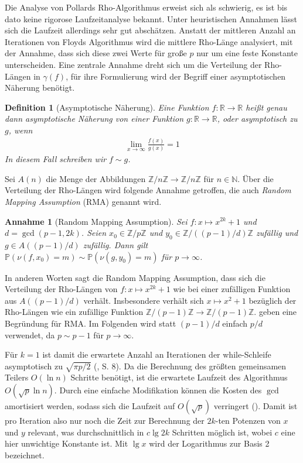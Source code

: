 \documentclass[a4paper, 10pt, ngerman]{article}
\newcommand{\N}{\mathbb{N}}
\newcommand{\R}{\mathbb{R}}
\newcommand{\Z}{\mathbb{Z}}
\renewcommand{\P}{\mathbb{P}}
\newtheorem{definition}{Definition}
\newtheorem*{assumption*}{Annahme}
\begin{document}
\noindent Die Analyse von Pollards Rho-Algorithmus erweist sich als schwierig, es ist bis dato keine rigorose Laufzeitanalyse bekannt. Unter heuristischen Annahmen lässt sich die Laufzeit allerdings sehr gut abschätzen. Anstatt der mittleren Anzahl an Iterationen von Floyds Algorithmus wird die mittlere Rho-Länge analysiert, mit der Annahme, dass sich diese zwei Werte für große $p$ nur um eine feste Konstante unterscheiden. Eine zentrale Annahme dreht sich um die Verteilung der Rho-Längen in $\gamma(f)$, für ihre Formulierung wird der Begriff einer asymptotischen Näherung benötigt.

\begin{definition}[Asymptotische Näherung]
    Eine Funktion $f : \R \to \R$ heißt genau dann asymptotische Näherung von einer Funktion $g : \R \to \R$, oder asymptotisch zu $g$, wenn
    \begin{align*}
        \lim_{x \to \infty} \frac {f(x)} {g(x)} = 1
    \end{align*}
    In diesem Fall schreiben wir $f \sim g$.
\end{definition}

\noindent Sei $A(n)$ die Menge der Abbildungen $\Z/n\Z \to \Z/n\Z$ für $n \in \N$. Über die Verteilung der Rho-Längen wird folgende Annahme getroffen, die auch \emph{Random Mapping Assumption} (RMA) genannt wird.

\begin{assumption*}[Random Mapping Assumption]
    Sei $f : x \mapsto x^{2k} + 1$ und $d = \gcd(p - 1, 2k)$. Seien $x_0 \in \Z/p\Z$ und $y_0 \in \Z/((p - 1)/d)\Z$ zufällig und $g \in A((p - 1)/d)$ zufällig. Dann gilt $\P(\nu(f, x_0) = m) \sim \P(\nu(g, y_0) = m)$ für $p \to \infty$.
\end{assumption*}

\noindent In anderen Worten sagt die Random Mapping Assumption, dass sich die Verteilung der Rho-Längen von $f : x \mapsto x^{2k} + 1$ wie bei einer zufälligen Funktion aus $A((p - 1)/d)$ verhält. Insbesondere verhält sich $x \mapsto x^2 + 1$ bezüglich der Rho-Längen wie ein zufällige Funktion $\Z/(p - 1)\Z \to \Z/(p - 1)\Z$. \cite{bp81} geben eine Begründung für RMA. Im Folgenden wird statt $(p - 1)/d$ einfach $p/d$ verwendet, da $p \sim p - 1$ für $p \to \infty$.

Für $k = 1$ ist damit die erwartete Anzahl an Iterationen der while-Schleife asymptotisch zu $\sqrt{\pi p / 2}$ (\cite{knu98}, S. 8). Da die Berechnung des größten gemeinsamen Teilers $O(\ln n)$ Schritte benötigt, ist die erwartete Laufzeit des Algorithmus $O(\sqrt p \ln n)$. Durch eine einfache Modifikation können die Kosten des $\gcd$ amortisiert werden, sodass sich die Laufzeit auf $O(\sqrt p)$ verringert (\cite{bre80}). Damit ist pro Iteration also nur noch die Zeit zur Berechnung der $2k$-ten Potenzen von $x$ und $y$ relevant, was durchschnittlich in $c \lg 2k$ Schritten möglich ist, wobei $c$ eine hier unwichtige Konstante ist. Mit $\lg x$ wird der Logarithmus zur Basis 2 bezeichnet.
\end{document}

